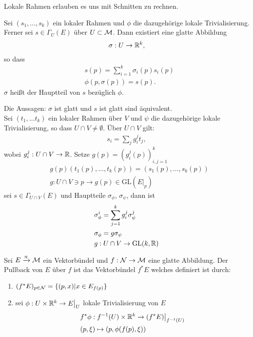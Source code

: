 Lokale Rahmen erlauben es uns mit Schnitten zu rechnen.

\begin{defs}[Hauptteil]
Sei $(s_1, \dots, s_k)$ ein lokaler Rahmen und $\phi$ die dazugehörige lokale Trivialisierung.
Ferner sei $s \in \Gamma_U (E)$ über $U \subset \mathcal{M}$.
Dann existiert eine glatte Abbildung
\begin{align}
\sigma : U \to \mathbb{R}^k,
\end{align}
so dass
\begin{align}
&s(p) = \sum^{k}_{i=1} \sigma_i (p) s_i(p)\\
&\phi(p, \sigma(p)) = s(p).
\end{align}
$\sigma$ heißt der Hauptteil von $s$ bezüglich $\phi$.
\end{defs}

\begin{bem}
Die Aussagen: $\sigma$ ist glatt und $s$ ist glatt sind äquivalent.\\
Sei $(t_1, \dots t_k)$ ein lokaler Rahmen über $V$ und $\psi$ die dazugehörige lokale Trivialisierung, so dass $U \cap V \neq \emptyset$.
Über $U \cap V$ gilt:
\begin{align}
s_i = \sum_j g^j_i t_j,
\end{align}
wobei $g^j_i : U \cap V \to \mathbb{R}$.
Setze $g(p) = (g^j_i (p))^k_{i,j =1}$
\begin{align}
&g(p)(t_1(p), \dots , t_k(p)) = (s_1(p), \dots, s_k(p))\\
&g: U \cap V \ni p \to g(p) \in \mathrm{GL}(E\big\vert_p)
\end{align}
sei $s \in \Gamma_{U \cap V} (E)$ und Hauptteile $\sigma_\phi$, $\sigma_\psi$, dann ist
\begin{align}
&\sigma^i_\phi = \sum^k_{j=1} g^j_i \sigma^j_{\psi}\\
&\sigma_\phi = g \sigma_\psi\\
&g : U \cap V \to \mathrm{GL} (k, \mathbb{R})
\end{align}
\end{bem}


\begin{defs}[Pullback]
Sei $E	\xrightarrow{\uppi} \mathcal{M}$ ein Vektorbündel und $f : \mathcal{N} \to \mathcal{M}$ eine glatte Abbildung.
Der Pullback von $E$ über $f$ ist das Vektorbündel $f^* E$ welches definiert ist durch:
\begin{enumerate}
\item $(f^* E)_{p \in \mathcal{N}} = \{ (p, x) \vert x \in E_{f(p)}\}$
\item sei $\phi : U \times \mathbb{R}^k \to E\big\vert_U$ lokale Trivialisierung von $E$
\begin{align}
&f^* \phi : f^{-1} (U) \times \mathbb{R}^k \to (f^* E)\big\vert_{f^{-1}(U)}\\
&(p, \xi) \mapsto (p, \phi(f(p), \xi)) 
\end{align}
\end{enumerate}
\end{defs}


